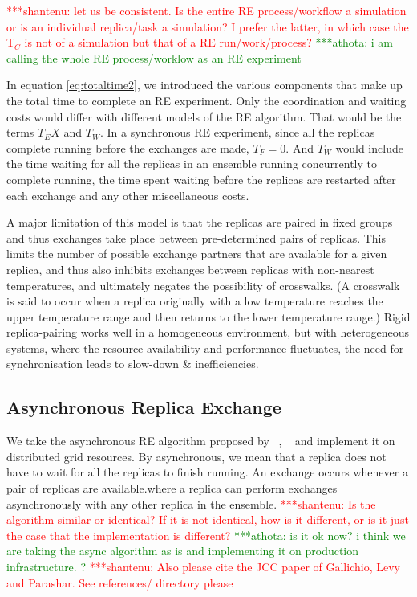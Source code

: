 \documentclass{rspublic}
\newcommand{\jhanote}[1]{ {\textcolor{red} { ***shantenu: #1 }}}
\newcommand{\athotanote}[1]{ {\textcolor{green} { ***athota: #1 }}}
\newcommand{\athotanote}[1]{}
\newcommand{\jhanote}[1]{}
\begin{document}
\jhanote{let us be consistent. Is the entire RE process/workflow a
  simulation or is an individual replica/task a simulation? I prefer
  the latter, in which case the T$_C$ is not of a simulation but that
  of a RE run/work/process?} \athotanote{i am calling the whole RE process/worklow as an RE experiment}

In equation \ref{eq:totaltime2}, we introduced the various components that make up the total time to complete an RE experiment. Only the coordination and waiting costs would differ with different models of the RE algorithm. That would be the terms $T_EX$ and $T_W$. In a synchronous RE experiment, since all the replicas complete running before the exchanges are made, $T_F = 0$. And $T_W$ would include the time waiting for all the replicas in an ensemble running concurrently to complete running, the time spent waiting before the replicas are restarted after each exchange and any other miscellaneous costs.


A major limitation of this model is that the replicas are paired in
fixed groups and thus exchanges take place between pre-determined
pairs of replicas.  This limits the number of possible exchange
partners that are available for a given replica, and thus also
inhibits exchanges between replicas with non-nearest temperatures, and
ultimately negates the possibility of crosswalks. (A crosswalk is said
to occur when a replica originally with a low temperature reaches the
upper temperature range and then returns to the lower temperature
range.)  Rigid replica-pairing works well in a homogeneous
environment, but with heterogeneous systems, where the resource
availability and performance fluctuates, the need for synchronisation
leads to slow-down \& inefficiencies.

 
\subsection{Asynchronous Replica Exchange}


We take the asynchronous RE algorithm proposed by ~\citep{parashar_arepex}, ~\citep{??} and implement it on distributed grid resources. By
asynchronous, we mean that a replica does not have to wait for all the
replicas to finish running. An exchange occurs whenever a pair of replicas are available.where a replica can perform exchanges
asynchronously with any other replica in the ensemble. \jhanote{Is the
  algorithm similar or identical? If it is not identical, how is it
  different, or is it just the case that the implementation is
  different?} \athotanote{is it ok now? i think we are taking the async algorithm as is and implementing it on production infrastructure. ?} \jhanote{Also please cite the JCC paper of Gallichio,
  Levy and Parashar. See references/ directory please} 
\end{document}
